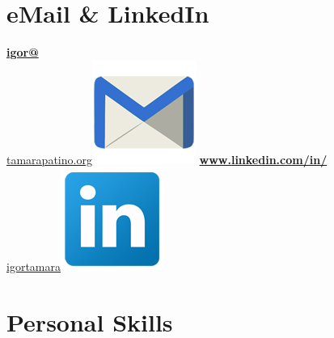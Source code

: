 \begin{aside}
    \section{eMail \& LinkedIn}
    \href{mailto:igor@tamarapatino.org}{\small{\textbf{igor@}\\tamarapatino.org}\includegraphics[scale=0.07]{img/email2.png}}
    \href{http:\\https://www.linkedin.com/in/igortamara/}{\textbf{www.linkedin.com/in/}\small{\\igortamara}\includegraphics[scale=0.07]{img/Linkedin.png}}
  ~
   ~
   ~
   ~
   ~
   ~
  \section{Personal Skills}
\end{aside}
